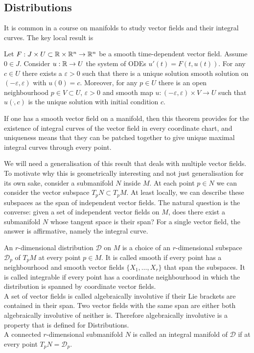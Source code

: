 \subsection{Distributions}

It is common in a course on manifolds to study vector fields and their integral curves.
The key local result is
\begin{theorem}
Let $F : J \times U \subset \mathbb{R}\times\mathbb{R}^n \to \mathbb{R}^n$ be a smooth time-dependent vector field. 
Assume $0 \in J$. 
Consider $u : \mathbb{R} \to U$ the system of ODEs $u'(t) = F(t,u(t))$.
For any $c \in U$ there exists a $\varepsilon > 0$ such that there is a unique solution smooth solution on $(-\varepsilon,\varepsilon)$ with $u(0) = c$.
Moreover, for any $p \in U$ there is an open neighbourhood $p \in V \subset U$, $\varepsilon > 0$ and smooth map $u : (-\varepsilon,\varepsilon) \times V \to U$ such that $u(\dot,c)$ is the unique solution with initial condition $c$.
\\\textup{\cite[Theorem~2.1.1]{Sharpe1997}}\cite[Theorem~1.2.1]{Ivey}
\end{theorem}

If one has a smooth vector field on a manifold, then this theorem provides for the existence of integral curves of the vector field in every coordinate chart, and uniqueness means that they can be patched together to give unique maximal integral curves through every point.

We will need a generalisation of this result that deals with multiple vector fields.
To motivate why this is geometrically interesting and not just generalisation for its own sake, consider a submanifold $N$ inside $M$.
At each point $p \in N$ we can consider the vector subspace $T_pN \subset T_pM$.
At least locally, we can describe these subspaces as the span of independent vector fields.
The natural question is the converse: given a set of independent vector fields on $M$, does there exist a submanifold $N$ whose tangent space is their span?
For a single vector field, the answer is affirmative, namely the integral curve.

\begin{definition}
An $r$-dimensional distribution $\mathcal{D}$ on $M$ is a choice of an $r$-dimensional subspace $\mathcal{D}_p$ of $T_p M$ at every point $p \in M$.
It is called smooth if every point has a neighbourhood and smooth vector fields $\{X_1, \dots, X_r \}$ that span the subspaces. 
It is called integrable if every point has a coordinate neighbourhood in which the distribution is spanned by coordinate vector fields.
\\
A set of vector fields is called algebraically involutive if their Lie brackets are contained in their span.
Two vector fields with the same span are either both algebraically involutive of neither is.
Therefore algebraically involutive is a property that is defined for Distributions.\\
A connected $r$-dimensional submanifold $N$ is called an integral manifold of $\mathcal{D}$ if at every point $T_pN = \mathcal{D}_p$.
\\\textup{\cite[2.2.1,.2.2.2,2.3.2]{Sharpe1997}}
\end{definition}

